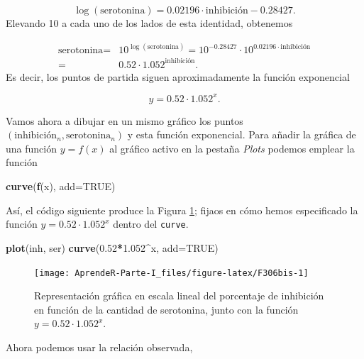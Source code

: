 \documentclass[]{book}
\newenvironment{Shaded}{\begin{snugshade}}{\end{snugshade}}
\newcommand{\DataTypeTok}[1]{\textcolor[rgb]{0.13,0.29,0.53}{#1}}
\newcommand{\FloatTok}[1]{\textcolor[rgb]{0.00,0.00,0.81}{#1}}
\newcommand{\KeywordTok}[1]{\textcolor[rgb]{0.13,0.29,0.53}{\textbf{#1}}}
\newcommand{\NormalTok}[1]{#1}
\newcommand{\OperatorTok}[1]{\textcolor[rgb]{0.81,0.36,0.00}{\textbf{#1}}}
\newcommand{\OtherTok}[1]{\textcolor[rgb]{0.56,0.35,0.01}{#1}}
\theoremstyle{definition}
\theoremstyle{definition}
\theoremstyle{definition}
\theoremstyle{remark}
\begin{document}
\[
\log(\textrm{serotonina})= 0.02196\cdot \mbox{inhibición}-0.28427.
\]
Elevando 10 a cada uno de los lados de esta identidad, obtenemos

\begin{align*}
\textrm{serotonina} = & 10^{\log(\textrm{serotonina})}= 10^{-0.28427}\cdot 10^{0.02196\cdot \textrm{inhibición}} \\ = &  0.52\cdot 1.052^{\textrm{inhibición}}.
\end{align*}
Es decir, los puntos de partida siguen aproximadamente la función exponencial

\[
y=0.52\cdot 1.052^{x}.
\]

Vamos ahora a dibujar en un mismo gráfico
los puntos \((\textrm{inhibición}_n,\textrm{serotonina}_n)\) y esta función exponencial. Para añadir la gráfica de una función \(y=f(x)\) al gráfico activo en la pestaña \emph{Plots} podemos emplear la función

\begin{Shaded}
\begin{Highlighting}[]
\KeywordTok{curve}\NormalTok{(}\KeywordTok{f}\NormalTok{(x), }\DataTypeTok{add=}\OtherTok{TRUE}\NormalTok{)}
\end{Highlighting}
\end{Shaded}

Así, el código siguiente produce la Figura \ref{fig:F306bis}; fijaos en cómo hemos especificado la función \(y=0.52\cdot 1.052^{x}\) dentro del \texttt{curve}.

\begin{Shaded}
\begin{Highlighting}[]
\KeywordTok{plot}\NormalTok{(inh, ser)}
\KeywordTok{curve}\NormalTok{(}\FloatTok{0.52}\OperatorTok{*}\FloatTok{1.052}\OperatorTok{^}\NormalTok{x, }\DataTypeTok{add=}\OtherTok{TRUE}\NormalTok{)}
\end{Highlighting}
\end{Shaded}

\begin{figure}

{\centering \texttt{[image: AprendeR-Parte-I\_files/figure-latex/F306bis-1]} 

}

\caption{Representación gráfica en escala lineal del porcentaje de inhibición en función de la cantidad de serotonina, junto con la función $y=0.52\cdot 1.052^x$.}\label{fig:F306bis}
\end{figure}

Ahora podemos usar la relación observada,
\end{document}
